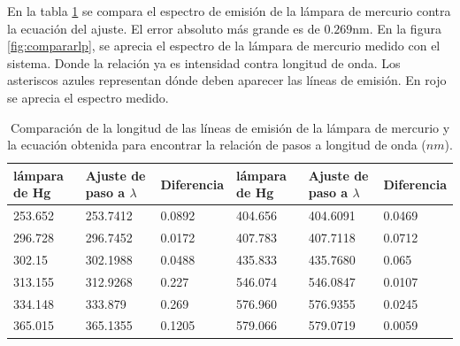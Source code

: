 En la tabla \ref{tabla:comparaPasoL} se compara el espectro de emisión de la lámpara de mercurio contra la ecuación del ajuste. El error absoluto más grande es de $0.269$nm. En la figura \ref{fig:compararlp}, se aprecia el espectro de la lámpara de mercurio medido con el sistema. Donde la relación ya es intensidad contra longitud de onda. Los asteriscos azules representan dónde deben aparecer las líneas de emisión. En rojo se aprecia el espectro medido.
   
\begin{table}[h]
	\centering 
	\caption{Comparación de la longitud de las líneas de emisión de la lámpara de mercurio y la ecuación obtenida para encontrar la relación de pasos a longitud de onda ($nm$).}
	\label{tabla:comparaPasoL}
	\begin{tabular}{|p{20mm}|p{20mm}|p{20mm}|p{20mm}|p{20mm}|p{20mm}|}
		\hline 
		 lámpara de Hg & Ajuste de paso a $\lambda$ & Diferencia  & lámpara de Hg & Ajuste de paso a $\lambda$ & Diferencia \\ 
		\hline 
		253.652 & 253.7412 & 0.0892 & 404.656 & 404.6091 & 0.0469 \\ 
		\hline 
		296.728 & 296.7452 & 0.0172 &407.783 & 407.7118 & 0.0712 \\ 
		\hline 
		302.15 & 302.1988 & 0.0488 &435.833 & 435.7680 & 0.065 \\ 
		\hline 
		313.155 & 312.9268 & 0.227 & 546.074 & 546.0847 & 0.0107  \\ 
		\hline 
		334.148 & 333.879 & 0.269 & 576.960 & 576.9355 & 0.0245  \\ 
		\hline 
		365.015 & 365.1355 & 0.1205 &  579.066 & 579.0719 & 0.0059\\ 
		\hline 
	\end{tabular} 
\end{table}

